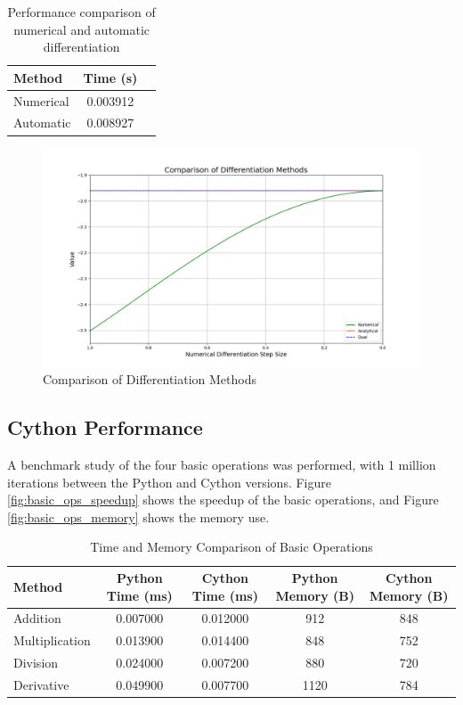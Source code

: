 \begin{table}[h]
    \centering
    \begin{tabular}{|l|c|c|}
    \hline
    Method & Time (s) \\
    \hline
    Numerical & 0.003912 \\
    Automatic & 0.008927 \\
    \hline
    \end{tabular}
    \caption{Performance comparison of numerical and automatic differentiation}
    \end{table}

\begin{figure}[h]
    \centering
    \includegraphics[width=1\textwidth]{images/diff_demo.png}
    \caption{Comparison of Differentiation Methods}
    \label{fig:diff_demo}
\end{figure}


\subsection{Cython Performance}
A benchmark study of the four basic operations was performed, with 1 million iterations between the Python and Cython versions.
Figure \ref{fig:basic_ops_speedup} shows the speedup of the basic operations, and Figure \ref{fig:basic_ops_memory} shows the memory use.

\begin{table}[h]
    \centering
    \begin{tabular}{|l|c|c|c|c|}
    \hline
    Method & Python Time (ms) & Cython Time (ms) & Python Memory (B) & Cython Memory (B) \\
    \hline
    Addition & 0.007000 & 0.012000 & 912 & 848\\
    Multiplication & 0.013900 & 0.014400 & 848 & 752\\
    Division & 0.024000 & 0.007200 & 880 & 720\\
    Derivative & 0.049900 & 0.007700 & 1120 & 784\\
    \hline
    \end{tabular}
    \caption{Time and Memory Comparison of Basic Operations}
    \end{table}

